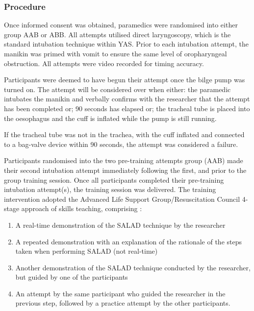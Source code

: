 \documentclass[]{article}
\providecommand{\tightlist}{%
  \setlength{\itemsep}{0pt}\setlength{\parskip}{0pt}}
\begin{document}
\hypertarget{procedure}{%
\subsubsection{Procedure}\label{procedure}}

Once informed consent was obtained, paramedics were randomised into
either group AAB or ABB. All attempts utilised direct laryngoscopy,
which is the standard intubation technique within YAS. Prior to each
intubation attempt, the manikin was primed with vomit to ensure the same
level of oropharyngeal obstruction. All attempts were video recorded for
timing accuracy.

Participants were deemed to have begun their attempt once the bilge pump
was turned on. The attempt will be considered over when either: the
paramedic intubates the manikin and verbally confirms with the
researcher that the attempt has been completed or; 90 seconds has
elapsed or; the tracheal tube is placed into the oesophagus and the cuff
is inflated while the pump is still running.

If the tracheal tube was not in the trachea, with the cuff inflated and
connected to a bag-valve device within 90 seconds, the attempt was
considered a failure.

Participants randomised into the two pre-training attempts group (AAB)
made their second intubation attempt immediately following the first,
and prior to the group training session. Once all participants completed
their pre-training intubation attempt(s), the training session was
delivered. The training intervention adopted the Advanced Life Support
Group/Resuscitation Council 4-stage approach of skills teaching,
comprising \citep{bullock_pocket_2008}:

\begin{enumerate}
\def\labelenumi{\arabic{enumi}.}
\tightlist
\item
  A real-time demonstration of the SALAD technique by the researcher
\item
  A repeated demonstration with an explanation of the rationale of the
  steps taken when performing SALAD (not real-time)
\item
  Another demonstration of the SALAD technique conducted by the
  researcher, but guided by one of the participants
\item
  An attempt by the same participant who guided the researcher in the
  previous step, followed by a practice attempt by the other
  participants.
\end{enumerate}
\end{document}

